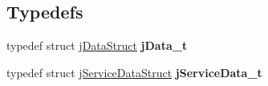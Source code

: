 \subsection*{Typedefs}
\begin{DoxyCompactItemize}
\item 
\hypertarget{c-icap-java_8c_a170722895fb8b557e85e1445db641676}{typedef struct \hyperlink{structj_data_struct}{j\+Data\+Struct} {\bfseries j\+Data\+\_\+t}}\label{c-icap-java_8c_a170722895fb8b557e85e1445db641676}

\item 
\hypertarget{c-icap-java_8c_a37e1c2a527fdd42e6dd88c45441bdf0c}{typedef struct \hyperlink{structj_service_data_struct}{j\+Service\+Data\+Struct} {\bfseries j\+Service\+Data\+\_\+t}}\label{c-icap-java_8c_a37e1c2a527fdd42e6dd88c45441bdf0c}

\end{DoxyCompactItemize}
